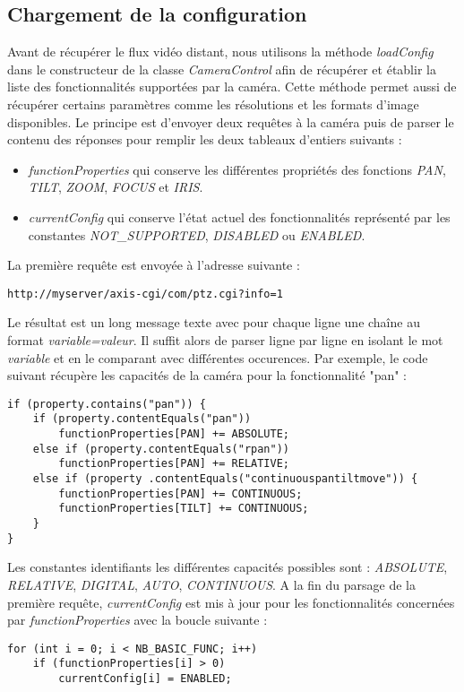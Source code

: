 \subsection{Chargement de la configuration}
Avant de récupérer le flux vidéo distant, nous utilisons la méthode \textit{loadConfig} dans le constructeur de la classe \textit{CameraControl} afin de récupérer et établir la liste des fonctionnalités supportées par la caméra. Cette méthode permet aussi de récupérer certains paramètres comme les résolutions et les formats d'image disponibles.
Le principe est d'envoyer deux requêtes à la caméra puis de parser le contenu des réponses pour remplir les deux tableaux d'entiers suivants :
\begin{itemize}
	\item \textit{functionProperties} qui conserve les différentes propriétés des fonctions \textit{PAN}, \textit{TILT}, \textit{ZOOM}, \textit{FOCUS} et \textit{IRIS}.
	\item \textit{currentConfig} qui conserve l'état actuel des fonctionnalités
	représenté par les constantes \textit{NOT\_SUPPORTED}, \textit{DISABLED} ou \textit{ENABLED}.
\end{itemize}
La première requête est envoyée à l'adresse suivante :
\begin{lstlisting}
http://myserver/axis-cgi/com/ptz.cgi?info=1
\end{lstlisting}
Le résultat est un long message texte avec pour chaque ligne une chaîne au format \textit{variable=valeur}.
Il suffit alors de parser ligne par ligne en isolant le mot \textit{variable} et en le comparant avec différentes occurences.
Par exemple, le code suivant récupère les capacités de la caméra pour la fonctionnalité "pan" :
\begin{lstlisting}
if (property.contains("pan")) {
	if (property.contentEquals("pan"))
		functionProperties[PAN] += ABSOLUTE;
	else if (property.contentEquals("rpan"))
		functionProperties[PAN] += RELATIVE;
	else if (property .contentEquals("continuouspantiltmove")) {
		functionProperties[PAN] += CONTINUOUS;
		functionProperties[TILT] += CONTINUOUS;
	}
}
\end{lstlisting}
Les constantes identifiants les différentes capacités possibles sont : \textit{ABSOLUTE}, \textit{RELATIVE}, \textit{DIGITAL}, \textit{AUTO}, \textit{CONTINUOUS}.
A la fin du parsage de la première requête, \textit{currentConfig} est mis à jour pour les fonctionnalités concernées par \textit{functionProperties} avec la boucle suivante :
\begin{lstlisting}
for (int i = 0; i < NB_BASIC_FUNC; i++)
	if (functionProperties[i] > 0)
		currentConfig[i] = ENABLED;
\end{lstlisting}

